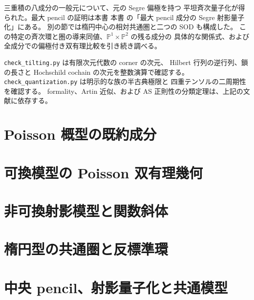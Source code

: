 \documentclass[11pt,a4paper]{ltjsarticle}
\theoremstyle{definition}
\newcommand{\PP}{\mathbb P}
\begin{document}
三重積の八成分の一般元について、元の Segre 偏極を持つ
平坦斉次量子化が得られた。最大 pencil の証明は本書
本書 の「最大 pencil 成分の Segre 射影量子化」にある。
別の節では楕円中心の相対共通圏と二つの SOD も構成した。
この特定の斉次環と圏の導来同値、$\PP^1\times\PP^2$ の残る成分の
具体的な関係式、および全成分での偏極付き双有理比較を引き続き調べる。

\texttt{check\_tilting.py} は有限次元代数の corner の次元、
Hilbert 行列の逆行列、鎖の長さと Hochschild cochain の次元を整数演算で確認する。
\texttt{check\_quantization.py} は明示的な族の半古典極限と
四重テンソルの二周期性を確認する。
formality、Artin 近似、および AS 正則性の分類定理は、上記の文献に依存する。


\part{Poisson 概型の既約成分}



\part{可換模型の Poisson 双有理幾何}


\part{非可換射影模型と関数斜体}







\part{楕円型の共通圏と反標準環}




\part{中央 pencil、射影量子化と共通模型}



\end{document}
